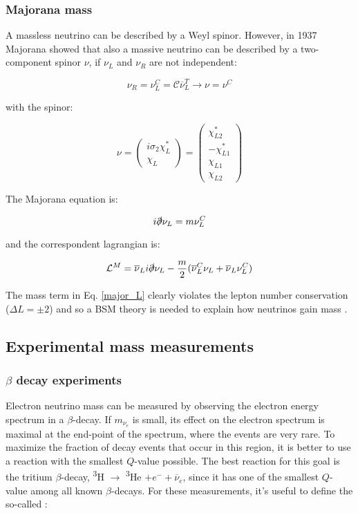 \subsubsection{Majorana mass}
A massless neutrino can be described by a Weyl spinor. However, in 1937 Majorana \cite{Majorana} showed that also a massive neutrino can be described by a two-component spinor $\nu$, if $\nu_L$ and $\nu_R$ are not independent:

\begin{equation*}
    \nu_R = \nu^C_L = \mathcal{C}\overline{\nu}_L^T \rightarrow \nu = \nu^C 
\end{equation*}

with the spinor: 

\begin{equation*}
    \nu =  
\begin{pmatrix}
   i \sigma_2 \chi^*_L \\ \chi_L
\end{pmatrix} = 
\begin{pmatrix}
   \chi^*_{L2} \\ -\chi^*_{L1} \\ \chi_{L1} \\ \chi_{L2}
\end{pmatrix}
\end{equation*}

The Majorana equation is:

\begin{equation}
    i\slashed{\partial}\nu_L = m \nu^C_L 
\end{equation}

and the correspondent lagrangian is: 

\begin{equation}
\label{major_L}
    \mathcal{L}^M = \overline{\nu}_L i\slashed{\partial}\nu_L - \frac{m}{2}(\overline{\nu}^C_L\nu_L + \overline{\nu}_L\nu^C_L)
\end{equation}

The mass term in Eq. \ref{major_L} clearly violates the lepton number conservation ($\Delta L = \pm 2$) and so a BSM theory is needed to explain how neutrinos gain mass \cite{giunti_kim_fundamental}.


\subsection{Experimental mass measurements}
\subsubsection{$\beta$ decay experiments}
Electron neutrino mass can be measured by observing the electron energy spectrum in a $\beta$-decay. If $m_{\nu_e}$ is small, its effect on the electron spectrum is maximal at the end-point of the spectrum, where the events are very rare. To maximize the fraction of decay events that occur in this region, it is better to use a reaction with the smallest $Q$-value possible. The best reaction for this goal is the tritium $\beta$-decay, \textsuperscript{3}H $\rightarrow$ \textsuperscript{3}He $+ e^- + \overline{\nu}_e$, since it has one of the smallest $Q$-value among all known $\beta$-decays. 
For these measurements, it's useful to define the so-called : 

